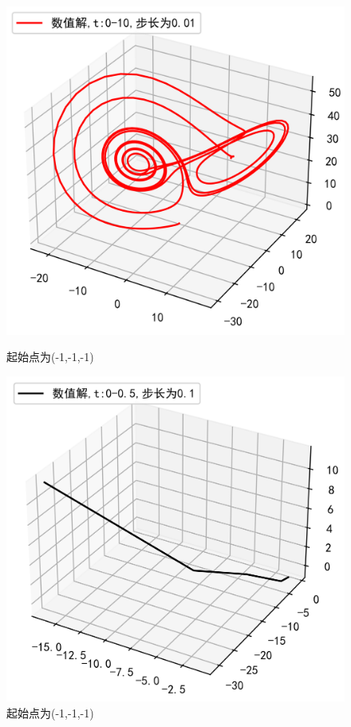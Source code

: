 \documentclass[a4paper]{article}%
\begin{document}
\begin{figure}[h]
    \begin{minipage}[h]{0.48\linewidth}
    \centering
    \includegraphics[scale=0.65]{83}
    \caption{起始点为(-1,-1,-1)}
    \end{minipage}
    \begin{minipage}[h]{0.48\linewidth}
    \centering
    \includegraphics[scale=0.65]{84}
    \caption{起始点为(-1,-1,-1)}
    \end{minipage}
\end{figure}
\end{document}
